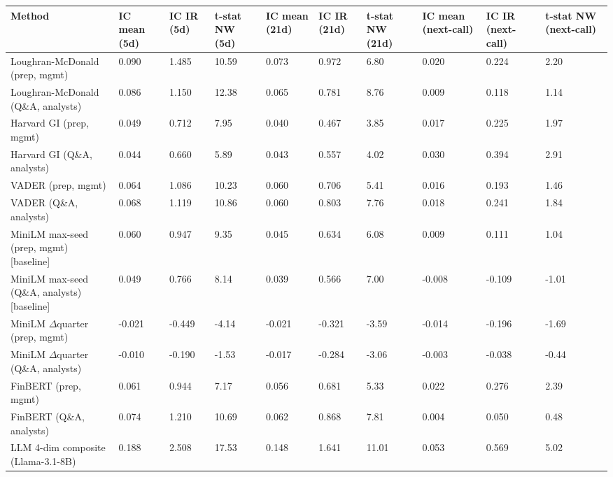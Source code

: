 \bigskip\noindent
\begin{tabular}{p{}p{}p{}p{}p{}p{}p{}p{}p{}p{}}
\toprule
Method & IC mean (5d) & IC IR (5d) & t-stat NW (5d) & IC mean (21d) & IC IR (21d) & t-stat NW (21d) & IC mean (next-call) & IC IR (next-call) & t-stat NW (next-call) \\
\hline
Loughran-McDonald (prep, mgmt) & 0.090 & 1.485 & 10.59 & 0.073 & 0.972 & 6.80 & 0.020 & 0.224 & 2.20 \\
Loughran-McDonald (Q\&A, analysts) & 0.086 & 1.150 & 12.38 & 0.065 & 0.781 & 8.76 & 0.009 & 0.118 & 1.14 \\
Harvard GI (prep, mgmt) & 0.049 & 0.712 & 7.95 & 0.040 & 0.467 & 3.85 & 0.017 & 0.225 & 1.97 \\
Harvard GI (Q\&A, analysts) & 0.044 & 0.660 & 5.89 & 0.043 & 0.557 & 4.02 & 0.030 & 0.394 & 2.91 \\
VADER (prep, mgmt) & 0.064 & 1.086 & 10.23 & 0.060 & 0.706 & 5.41 & 0.016 & 0.193 & 1.46 \\
VADER (Q\&A, analysts) & 0.068 & 1.119 & 10.86 & 0.060 & 0.803 & 7.76 & 0.018 & 0.241 & 1.84 \\
MiniLM max-seed (prep, mgmt) [baseline] & 0.060 & 0.947 & 9.35 & 0.045 & 0.634 & 6.08 & 0.009 & 0.111 & 1.04 \\
MiniLM max-seed (Q\&A, analysts) [baseline] & 0.049 & 0.766 & 8.14 & 0.039 & 0.566 & 7.00 & -0.008 & -0.109 & -1.01 \\
MiniLM $\Delta$quarter (prep, mgmt) & -0.021 & -0.449 & -4.14 & -0.021 & -0.321 & -3.59 & -0.014 & -0.196 & -1.69 \\
MiniLM $\Delta$quarter (Q\&A, analysts) & -0.010 & -0.190 & -1.53 & -0.017 & -0.284 & -3.06 & -0.003 & -0.038 & -0.44 \\
FinBERT (prep, mgmt) & 0.061 & 0.944 & 7.17 & 0.056 & 0.681 & 5.33 & 0.022 & 0.276 & 2.39 \\
FinBERT (Q\&A, analysts) & 0.074 & 1.210 & 10.69 & 0.062 & 0.868 & 7.81 & 0.004 & 0.050 & 0.48 \\
LLM 4-dim composite (Llama-3.1-8B) & 0.188 & 2.508 & 17.53 & 0.148 & 1.641 & 11.01 & 0.053 & 0.569 & 5.02 \\
\bottomrule
\end{tabular}

